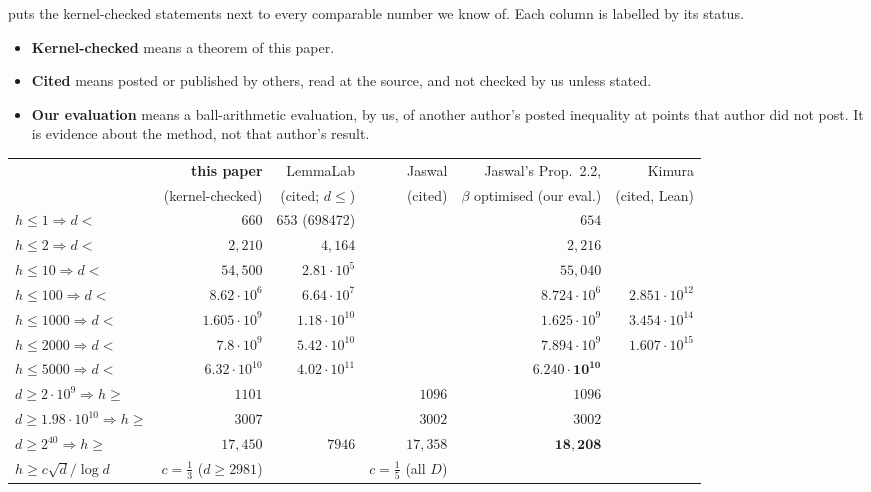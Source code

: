\documentclass[11pt]{article}
\theoremstyle{definition}
\begin{document}
 puts the kernel-checked statements next to every comparable number we know of. Each column is labelled by its status.
\begin{itemize}[nosep]
\item \textbf{Kernel-checked} means a theorem of this paper.
\item \textbf{Cited} means posted or published by others, read at the source, and not checked by us unless stated.
\item \textbf{Our evaluation} means a ball-arithmetic evaluation, by us, of another author's posted inequality at points that author did not post. It is evidence about the method, not that author's result.
\end{itemize}

\begin{table}[h]
\centering\footnotesize\setlength{\tabcolsep}{4pt}
\begin{tabular}{@{}lrrrrr@{}}
\toprule
 & \textbf{this paper} & LemmaLab & Jaswal & Jaswal's Prop.~2.2, & Kimura\\
 & (kernel-checked) & (cited; $d \le$) & (cited) & $\beta$ optimised (our eval.) & (cited, Lean)\\
\midrule
$h \le 1 \Rightarrow d <$ & $660$ & $653$ (698472) & & $654$ & \\
$h \le 2 \Rightarrow d <$ & $2{,}210$ & $4{,}164$ & & $2{,}216$ & \\
$h \le 10 \Rightarrow d <$ & $54{,}500$ & $2.81\cdot10^5$ & & $55{,}040$ & \\
$h \le 100 \Rightarrow d <$ & $8.62\cdot10^6$ & $6.64\cdot10^7$ & & $8.724\cdot10^6$ & $2.851\cdot10^{12}$\\
$h \le 1000 \Rightarrow d <$ & $1.605\cdot10^9$ & $1.18\cdot10^{10}$ & & $1.625\cdot10^9$ & $3.454\cdot10^{14}$\\
$h \le 2000 \Rightarrow d <$ & $7.8\cdot10^9$ & $5.42\cdot10^{10}$ & & $7.894\cdot10^9$ & $1.607\cdot10^{15}$\\
$h \le 5000 \Rightarrow d <$ & $6.32\cdot10^{10}$ & $4.02\cdot10^{11}$ & & $\mathbf{6.240\cdot10^{10}}$ & \\
\midrule
$d \ge 2\cdot10^9 \Rightarrow h \ge$ & $1101$ & & $1096$ & $1096$ & \\
$d \ge 1.98\cdot10^{10} \Rightarrow h \ge$ & $3007$ & & $3002$ & $3002$ & \\
$d \ge 2^{40} \Rightarrow h \ge$ & $17{,}450$ & $7946$ & $17{,}358$ & $\mathbf{18{,}208}$ & \\
\midrule
$h \ge c\sqrt d/\log d$ & $c = \frac13$ ($d \ge 2981$) & & $c = \frac15$ (all $D$) & & \\

\end{tabular}
\end{table}
\end{document}
